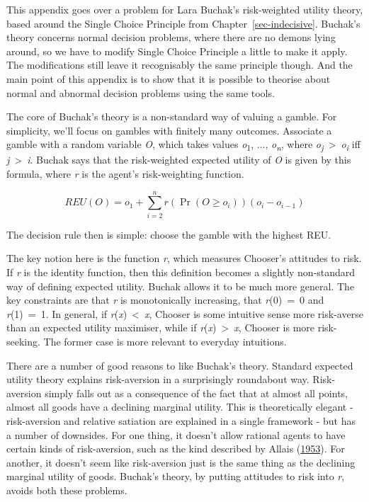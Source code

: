 \documentclass[
  12pt,
  letterpaper,
  DIV=11,
  numbers=noendperiod]{scrreprt}
\begin{document}
This appendix goes over a problem for Lara Buchak's risk-weighted
utility theory, based around the Single Choice Principle from
Chapter~\ref{sec-indecisive}. Buchak's theory concerns normal decision
problems, where there are no demons lying around, so we have to modify
Single Choice Principle a little to make it apply. The modifications
still leave it recognisably the same principle though. And the main
point of this appendix is to show that it is possible to theorise about
normal and abnormal decision problems using the same tools.

The core of Buchak's theory is a non-standard way of valuing a gamble.
For simplicity, we'll focus on gambles with finitely many outcomes.
Associate a gamble with a random variable \emph{O}, which takes values
\emph{o}\textsubscript{1}, \(\dots\), \emph{o\textsubscript{n}}, where
\emph{o\textsubscript{j}}~\textgreater~\emph{o\textsubscript{i}} iff
\emph{j}~\textgreater~\emph{i}. Buchak says that the risk-weighted
expected utility of \emph{O} is given by this formula, where \emph{r} is
the agent's risk-weighting function.

\[
REU(O) = o_1 + \sum_{i = 2}^n r(\Pr(O \geq o_i))(o_i - o_{i-1})
\]

The decision rule then is simple: choose the gamble with the highest
REU.

The key notion here is the function \emph{r}, which measures Chooser's
attitudes to risk. If \emph{r} is the identity function, then this
definition becomes a slightly non-standard way of defining expected
utility. Buchak allows it to be much more general. The key constraints
are that \emph{r} is monotonically increasing, that \emph{r}(0)~=~0 and
\emph{r}(1)~=~1. In general, if \emph{r}(\emph{x})~\textless~\emph{x},
Chooser is some intuitive sense more risk-averse than an expected
utility maximiser, while if \emph{r}(\emph{x})~\textgreater~\emph{x},
Chooser is more risk-seeking. The former case is more relevant to
everyday intuitions.

There are a number of good reasons to like Buchak's theory. Standard
expected utility theory explains risk-aversion in a surprisingly
roundabout way. Risk-aversion simply falls out as a consequence of the
fact that at almost all points, almost all goods have a declining
marginal utility. This is theoretically elegant - risk-aversion and
relative satiation are explained in a single framework - but has a
number of downsides. For one thing, it doesn't allow rational agents to
have certain kinds of risk-aversion, such as the kind described by
Allais (\protect\hyperlink{ref-Allais1953}{1953}). For another, it
doesn't seem like risk-aversion just is the same thing as the declining
marginal utility of goods. Buchak's theory, by putting attitudes to risk
into \emph{r}, avoids both these problems.
\end{document}

